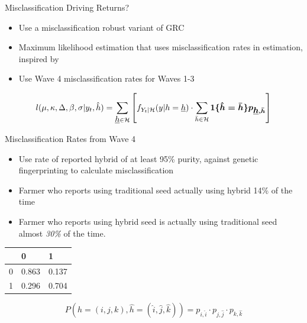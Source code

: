 \documentclass{beamer}
\begin{document}
\begin{frame}{Misclassification Driving Returns?}
\begin{itemize}
    \item Use a misclassification robust variant of GRC
    \item Maximum likelihood estimation that uses misclassification rates in estimation, inspired by \cite{michuda2021three}
    \item Use Wave 4 misclassification rates for Waves 1-3
\end{itemize}

\begin{equation*}
\label{eq:mr-grc}
l(\mu, \kappa, \Delta, \beta, \sigma|y_{t}, \hat{h}) = \sum_{\underbar{$h$}\in\mathcal{H}} \left[ f_{Y_{t}| \mathcal{H}}(y|h=\underbar{$h$})\cdot  \sum_{\bar{h} \in \mathcal{H}} \boldsymbol{1\{\hat{h}=\bar{h}\} p_{\underbar{$h$}, \bar{h}}} \right]
\end{equation*}

\end{frame}

\begin{frame}{Misclassification Rates from Wave 4}

\begin{itemize}
    \item Use rate of reported hybrid of at least 95\% purity, against genetic fingerprinting to calculate misclassification
    \item Farmer who reports using traditional seed actually using hybrid 14\% of the time
    \item Farmer who reports using hybrid seed is actually using traditional seed almost \textit{30\%} of the time.
\end{itemize}
    \begin{table}[]
        \centering
        \begin{tabular}{lll}
        \toprule
         & 0 & 1 \\
        \midrule
        0 & 0.863 & 0.137 \\
        1 & 0.296 & 0.704 \\
        \bottomrule
        \end{tabular}
    \end{table}
    
\begin{equation}
    \label{eq:misclass}
    P(h = (i,j,k) , \hat{h} = (\hat{i},\hat{j}, \hat{k})) = p_{i, \hat{i}}\cdot p_{j, \hat{j}}\cdot p_{k, \hat{k}}
\end{equation}
\end{frame}
\end{document}
